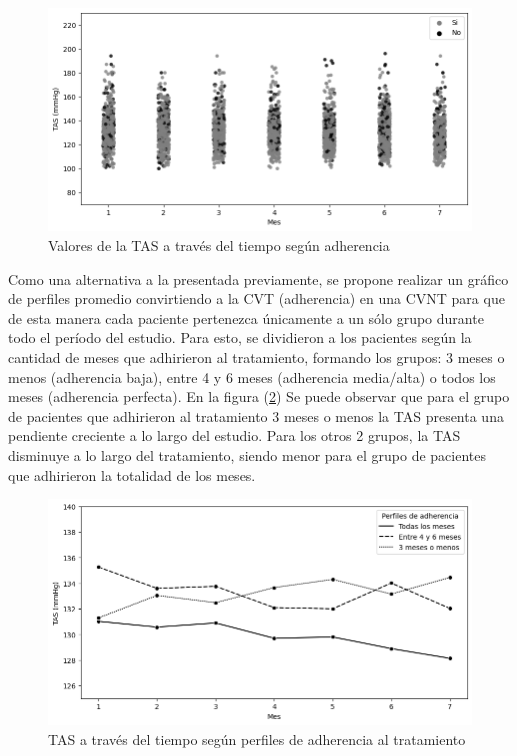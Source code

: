 \documentclass[spanish]{article}
\numberwithin{figure}{subsection}
\numberwithin{equation}{subsection}
\numberwithin{table}{subsection}
\begin{document}
\begin{figure}[H]
	\centering
	\includegraphics[scale=0.5]{img/TAS_vs_tpo_with_adherencia_scatter.png}
	\caption{Valores de la TAS a través del tiempo según adherencia}
	\label{TAS_with_adh_scatter}
\end{figure}

Como una alternativa a la presentada previamente, se propone realizar un gráfico
de perfiles promedio convirtiendo a la CVT (adherencia) en una CVNT para que de
esta manera cada paciente pertenezca únicamente a un sólo grupo durante todo el
período del estudio. Para esto, se dividieron a los pacientes según la cantidad
de meses que adhirieron al tratamiento, formando los grupos: 3 meses o menos
(adherencia baja), entre 4 y 6 meses (adherencia media/alta) o todos los meses
(adherencia perfecta). En la figura (\ref{TAS_with_adh}) Se puede observar que
para el grupo de pacientes que adhirieron al tratamiento 3 meses o menos la TAS
presenta una pendiente creciente a lo largo del estudio. Para los otros 2
grupos, la TAS disminuye a lo largo del tratamiento, siendo menor para el grupo
de pacientes que adhirieron la totalidad de los meses.

\begin{figure}[H]
	\centering
	\includegraphics[scale=0.5]{img/TAS_vs_tpo_with_adherencia.png}
	\caption{TAS a través del tiempo según perfiles de adherencia al tratamiento}
	\label{TAS_with_adh}
\end{figure}
\end{document}
